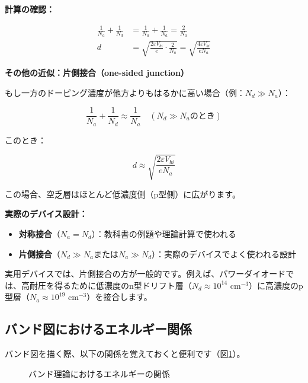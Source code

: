 \textbf{計算の確認：}

\begin{align}
\frac{1}{N_a} + \frac{1}{N_d} &= \frac{1}{N_a} + \frac{1}{N_a} = \frac{2}{N_a} \\
d &= \sqrt{\frac{2\varepsilon V_{bi}}{e} \cdot \frac{2}{N_a}} = \sqrt{\frac{4\varepsilon V_{bi}}{eN_a}}
\end{align}

\textbf{その他の近似：片側接合（one-sided junction）}

もし一方のドーピング濃度が他方よりもはるかに高い場合（例：$N_d \gg N_a$）：

\begin{equation}
\frac{1}{N_a} + \frac{1}{N_d} \approx \frac{1}{N_a} \quad (\text{$N_d \gg N_a$のとき})
\end{equation}

このとき：

\begin{equation}
d \approx \sqrt{\frac{2\varepsilon V_{bi}}{eN_a}}
\end{equation}

この場合、空乏層はほとんど低濃度側（p型側）に広がります。

\textbf{実際のデバイス設計：}

\begin{itemize}
\item \textbf{対称接合}（$N_a = N_d$）：教科書の例題や理論計算で使われる
\item \textbf{片側接合}（$N_d \gg N_a$または$N_a \gg N_d$）：実際のデバイスでよく使われる設計
\end{itemize}

実用デバイスでは、片側接合の方が一般的です。例えば、パワーダイオードでは、高耐圧を得るために低濃度のn型ドリフト層（$N_d \approx 10^{14}$ cm$^{-3}$）に高濃度のp型層（$N_a \approx 10^{19}$ cm$^{-3}$）を接合します。

\subsection{バンド図におけるエネルギー関係}

バンド図を描く際、以下の関係を覚えておくと便利です（図\ref{fig:band_energy}）。

\begin{figure}[H]
\centering
{}
\caption{バンド理論におけるエネルギーの関係}
\label{fig:band_energy}
\end{figure}

